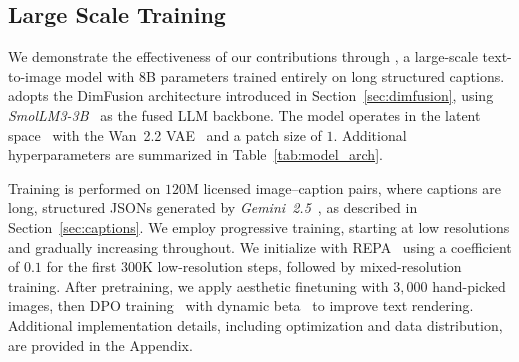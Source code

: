 









\subsection{Large Scale Training}\label{sec:training}






We demonstrate the effectiveness of our contributions through \emph{\modelname{}}, a large-scale text-to-image model with $8$B parameters trained entirely on long structured captions. 
\modelname{} adopts the DimFusion architecture introduced in Section~\ref{sec:dimfusion}, using \emph{SmolLM3-3B}~\cite{bakouch2025smollm3} as the fused LLM backbone. The model operates in the latent space~\cite{rombach2022high} with the Wan~2.2 VAE~\cite{wan2025wan} and a patch size of $1$. 
Additional hyperparameters are summarized in Table~\ref{tab:model_arch}.


Training is performed on $120$M licensed image–caption pairs, where captions are long, structured JSONs generated by \emph{Gemini~2.5}~\cite{comanici2025gemini}, as described in Section~\ref{sec:captions}. We employ progressive training, starting at low resolutions and gradually increasing throughout. We initialize with REPA~\cite{yu2024representation} using a coefficient of $0.1$ for the first $300$K low-resolution steps, followed by mixed-resolution training. After pretraining, we apply aesthetic finetuning with $3{,}000$ hand-picked images, then DPO training~\cite{wallace2024diffusion} with dynamic beta~\cite{liu2025improving} to improve text rendering. Additional implementation details, including optimization and data distribution, are provided in the Appendix.

